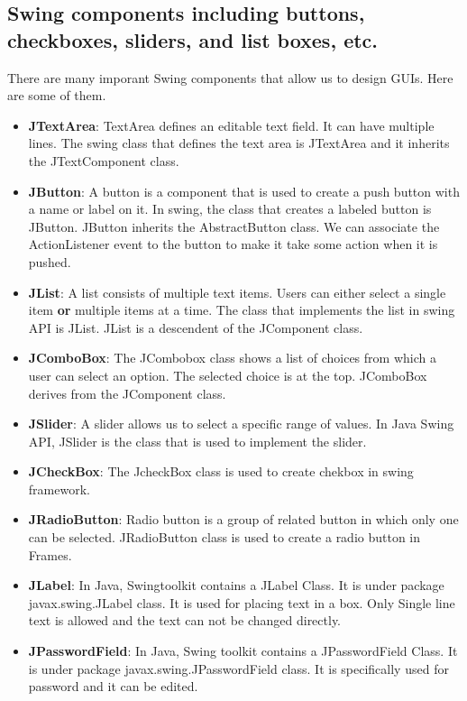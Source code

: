 \documentclass[11pt]{article}
\begin{document}
\subsection{Swing components including buttons, checkboxes, sliders, and list boxes, etc.}
There are many imporant Swing components that allow us to design GUIs. Here are some of them.
\begin{itemize}
	\item \textbf{JTextArea}: TextArea defines an editable text field. It can have multiple lines. The swing class that defines the text area is JTextArea and it inherits the JTextComponent class.
	\item \textbf{JButton}: A button is a component that is used to create a push button with a name or label on it. In swing, the class that creates a labeled button is JButton. JButton inherits the AbstractButton class. We can associate the ActionListener event to the button to make it take some action when it is pushed.
	\item \textbf{JList}: A list consists of multiple text items. Users can either select a single item \textbf{or} multiple items at a time. The class that implements the list in swing API is JList. JList is a descendent of the JComponent class.
	\item \textbf{JComboBox}: The JCombobox class shows a list of choices from which a user can select an option. The selected choice is at the top. JComboBox derives from the JComponent class.
	\item \textbf{JSlider}: A slider allows us to select a specific range of values. In Java Swing API, JSlider is the class that is used to implement the slider.
	\item \textbf{JCheckBox}: The JcheckBox class is used to create chekbox in swing framework.
	\item \textbf{JRadioButton}: Radio button is a group of related button in which only one can be selected. JRadioButton class is used to create a radio button in Frames.
	\item \textbf{JLabel}: In Java, Swingtoolkit contains a JLabel Class. It is under package javax.swing.JLabel class. It is used for placing text in a box. Only Single line text is allowed and the text can not be changed directly.
	\item \textbf{JPasswordField}: In Java, Swing toolkit contains a JPasswordField Class. It is under package javax.swing.JPasswordField class. It is specifically used for password and it can be edited.
\end{itemize}
\end{document}
